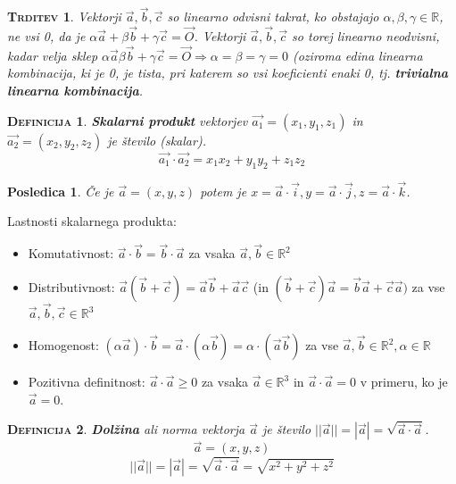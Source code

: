 \documentclass[a4paper,12pt]{article}
\newtheorem*{trditev}{\textsc{Trditev}}
\newtheorem*{posl}{Posledica}
\newtheorem*{definicija}{\textsc{Definicija}}
\begin{document}
\begin{trditev}
 Vektorji $\vec{a}, \vec{b}, \vec{c}$ so linearno odvisni takrat, ko obstajajo $\alpha, \beta, \gamma \in \mathbb{R}$, ne vsi 0, da je $\alpha \vec{a} + \beta \vec{b} + \gamma \vec{c} = \vec{O}$. Vektorji $\vec{a}, \vec{b}, \vec{c}$ so torej linearno neodvisni, kadar velja sklep $\alpha \vec{a} \beta \vec{b} + \gamma \vec{c} = \vec{O} \Rightarrow \alpha = \beta = \gamma = 0$ (oziroma edina linearna kombinacija, ki je 0, je tista, pri katerem so vsi koeficienti enaki 0, tj. \textbf{trivialna linearna kombinacija}.\\
\end{trditev}

\begin{definicija}
\textbf{Skalarni produkt} vektorjev $\vec{a_1}=(x_1, y_1, z_1)$ in $\vec{a_2} = (x_2, y_2, z_2)$ je število (skalar). $$ \vec{a_1} \cdot \vec{a_2} = x_1 x_2 + y_1 y_2 + z_1 z_2$$ 
\end{definicija}

\begin{posl}
Če je $\vec{a} = (x,y,z)$ potem je $x= \vec{a} \cdot \vec{i}, y = \vec{a} \cdot \vec{j}, z = \vec{a} \cdot \vec{k}$.\\
\end{posl}

Lastnosti skalarnega produkta:
\begin{itemize}
\item Komutativnost: $\vec{a} \cdot \vec{b} = \vec{b} \cdot \vec{a}$ za vsaka $\vec{a}, \vec{b} \in \mathbb{R}^2$
\item Distributivnost: $\vec{a}(\vec{b} + \vec{c}) = \vec{a} \vec{b} + \vec{a} \vec{c}$  (in $(\vec{b} + \vec{c}) \vec{a} = \vec{b} \vec{a} + \vec{c} \vec{a})$ za vse $\vec{a}, \vec{b}, \vec{c} \in \mathbb{R}^3$
\item Homogenost: $(\alpha \vec{a}) \cdot \vec{b} = \vec{a} \cdot (\alpha \vec{b}) = \alpha \cdot (\vec{a} \vec{b})$ za vse $\vec{a}, \vec{b} \in \mathbb{R}^2, \alpha \in \mathbb{R}$
\item Pozitivna definitnost: $\vec{a} \cdot \vec{a} \geq 0$ za vsaka $\vec{a} \in \mathbb{R}^3$ in $\vec{a} \cdot \vec{a} = 0$ v primeru, ko je $\vec{a} = 0$.\\
\end{itemize}

\begin{definicija}
\textbf{Dolžina} ali norma vektorja $\vec{a}$ je število $||\vec{a}|| = |\vec{a}| = \sqrt{\vec{a} \cdot \vec{a}}$. $$ \vec{a} = (x,y,z)$$ $$|| \vec{a}|| = |\vec{a}| = \sqrt{\vec{a} \cdot \vec{a}} = \sqrt{x^2 + y^2 + z^2}$$
\end{definicija}
\end{document}
